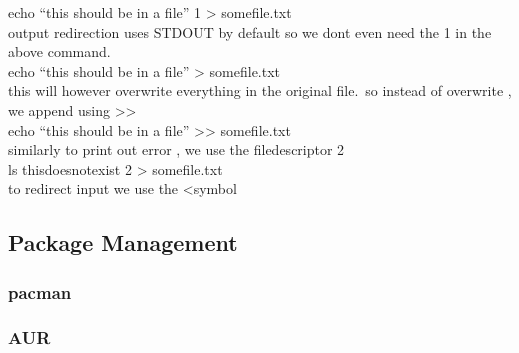 \noindent
echo ``this should be in a file'' 1 \textgreater \hspace{0.2cm} somefile.txt\\

\noindent
output redirection uses STDOUT by default so we dont even need the 1 in the
above command.\\

\noindent
echo ``this should be in a file'' \textgreater \hspace{0.1cm} somefile.txt \\

\noindent
this will however overwrite everything in the original file.\ so instead of
overwrite , we append using \textgreater \textgreater \\

\noindent
echo ``this should be in a file'' \textgreater \textgreater \hspace{0.1cm}
somefile.txt\\

\noindent
similarly to print out error , we use the filedescriptor 2\\

\noindent
ls thisdoesnotexist 2 \textgreater \hspace{0.1cm} somefile.txt\\

\noindent
to redirect input we use the \textless symbol\\


\subsectionend

\subsection{Package Management}
\label{ssec:package_management}

\subsubsection{pacman}
\label{sssec:pacman}



\subsubsectionend

\subsubsection{AUR}
\label{sssec:aur}




